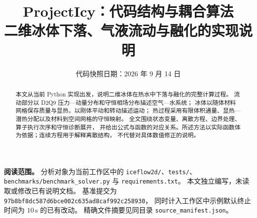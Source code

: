 \documentclass[UTF8,11pt,a4paper,fontset=none]{ctexart}
\title{\vspace{-12mm}\textbf{ProjectIcy：代码结构与耦合算法}\\[4mm]
  \large 二维冰体下落、气液流动与融化的实现说明}
\author{}
\date{代码快照日期：2026 年 9 月 14 日}
\newcommand{\code}[1]{\nolinkurl{#1}}
\numberwithin{equation}{section}
\begin{document}
\maketitle
\vspace{-8mm}
\begin{abstract}
本文从当前 Python 实现出发，说明二维冰体在热水中下落与融化的完整计算过程。
流动部分以 D2Q9 压力—动量分布和守恒相场分布描述空气—水系统；
冰体以随体材料网格保存质量与显热，以刚体平动和转动描述运动；
热过程采用有限体积通量、显热—潜热分配以及材料到空间网格的守恒映射。
全文围绕状态变量、离散方程、边界处理、算子执行次序和守恒诊断展开，
并给出公式与函数的对应关系。所述方法以实际函数体为依据；连续方程用于解释离散结构，
不代替对具体数值修正的说明。
\end{abstract}
\noindent\textbf{阅读范围。}
分析对象为当前工作区中的 \code{iceflow2d/}、\code{tests/}、
\code{benchmarks/benchmark_solver.py} 与 \code{requirements.txt}。
本文独立编写，未读取或修改已有说明文档。
基准提交为 \code{97b8bf8dc587d6bce002c635ad8caf992c258930}，
同时计入工作区中示例默认终止时间为 $10\,\mathrm s$ 的已有改动。
精确文件摘要见同目录 \code{source_manifest.json}。

\begingroup
\small\linespread{1.0}\selectfont
\setlength{\parskip}{0pt}
\tableofcontents
\endgroup
\clearpage






\appendix

\end{document}
